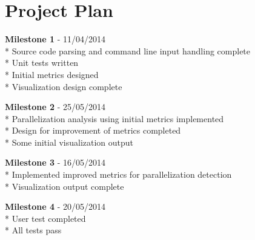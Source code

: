 \documentclass[a4paper]{article}
\begin{document}
\section{Project Plan}
\begin{description}
\item \textbf{Milestone 1} - 11/04/2014 \\*
Source code parsing and command line input handling complete\\*
Unit tests written \\*
Initial metrics designed\\*
Visualization design complete
\item \textbf{Milestone 2} - 25/05/2014\\*
Parallelization analysis using initial metrics implemented\\*
Design for improvement of metrics completed\\*
Some initial visualization output
\item \textbf{Milestone 3}  - 16/05/2014\\*
Implemented improved metrics for parallelization detection \\*
Visualization output complete
\item \textbf{Milestone 4} - 20/05/2014\\*
User test completed\\*
All tests pass
\end{description}



\end{document}
